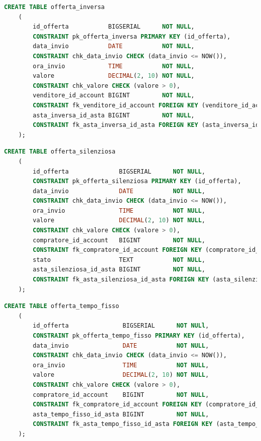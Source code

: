 \begin{lstlisting}[language=SQL, caption=Relazione offerta inversa]
    CREATE TABLE offerta_inversa
    (
        id_offerta           BIGSERIAL      NOT NULL,
        CONSTRAINT pk_offerta_inversa PRIMARY KEY (id_offerta),
        data_invio           DATE           NOT NULL,
        CONSTRAINT chk_data_invio CHECK (data_invio <= NOW()),
        ora_invio            TIME           NOT NULL,
        valore               DECIMAL(2, 10) NOT NULL,
        CONSTRAINT chk_valore CHECK (valore > 0),
        venditore_id_account BIGINT         NOT NULL,
        CONSTRAINT fk_venditore_id_account FOREIGN KEY (venditore_id_account) REFERENCES venditore (id_account) ON UPDATE CASCADE ON DELETE CASCADE,
        asta_inversa_id_asta BIGINT         NOT NULL,
        CONSTRAINT fk_asta_inversa_id_asta FOREIGN KEY (asta_inversa_id_asta) REFERENCES asta_inversa (id_asta) ON UPDATE CASCADE ON DELETE CASCADE
    );
\end{lstlisting}

\begin{lstlisting}[language=SQL, caption=Relazione offerta silenziosa]
    CREATE TABLE offerta_silenziosa
    (
        id_offerta              BIGSERIAL      NOT NULL,
        CONSTRAINT pk_offerta_silenziosa PRIMARY KEY (id_offerta),
        data_invio              DATE           NOT NULL,
        CONSTRAINT chk_data_invio CHECK (data_invio <= NOW()),
        ora_invio               TIME           NOT NULL,
        valore                  DECIMAL(2, 10) NOT NULL,
        CONSTRAINT chk_valore CHECK (valore > 0),
        compratore_id_account   BIGINT         NOT NULL,
        CONSTRAINT fk_compratore_id_account FOREIGN KEY (compratore_id_account) REFERENCES compratore (id_account) ON UPDATE CASCADE ON DELETE CASCADE,
        stato                   TEXT           NOT NULL,
        asta_silenziosa_id_asta BIGINT         NOT NULL,
        CONSTRAINT fk_asta_silenziosa_id_asta FOREIGN KEY (asta_silenziosa_id_asta) REFERENCES asta_silenziosa (id_asta) ON UPDATE CASCADE ON DELETE CASCADE
    );
\end{lstlisting}

\begin{lstlisting}[language=SQL, caption=Relazione offerta a tempo fisso]
    CREATE TABLE offerta_tempo_fisso
    (
        id_offerta               BIGSERIAL      NOT NULl,
        CONSTRAINT pk_offerta_tempo_fisso PRIMARY KEY (id_offerta),
        data_invio               DATE           NOT NULL,
        CONSTRAINT chk_data_invio CHECK (data_invio <= NOW()),
        ora_invio                TIME           NOT NULL,
        valore                   DECIMAL(2, 10) NOT NULL,
        CONSTRAINT chk_valore CHECK (valore > 0),
        compratore_id_account    BIGINT         NOT NULL,
        CONSTRAINT fk_compratore_id_account FOREIGN KEY (compratore_id_account) REFERENCES compratore (id_account) ON UPDATE CASCADE ON DELETE CASCADE,
        asta_tempo_fisso_id_asta BIGINT         NOT NULL,
        CONSTRAINT fk_asta_tempo_fisso_id_asta FOREIGN KEY (asta_tempo_fisso_id_asta) REFERENCES asta_tempo_fisso (id_asta) ON UPDATE CASCADE ON DELETE CASCADE
    );
\end{lstlisting}